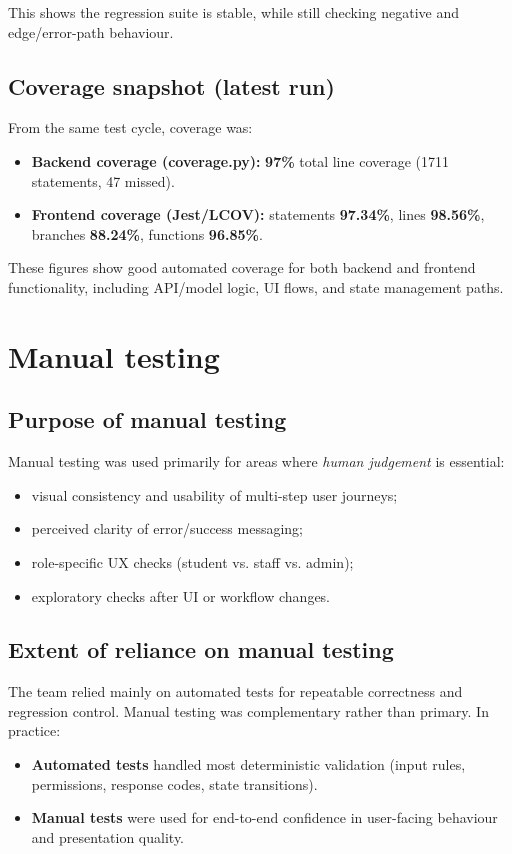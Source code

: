 This shows the regression suite is stable, while still checking negative and edge/error-path behaviour.

\subsection{Coverage snapshot (latest run)}

From the same test cycle, coverage was:
\begin{itemize}
	\item \textbf{Backend coverage (coverage.py):} \textbf{97\%} total line coverage (1711 statements, 47 missed).
	\item \textbf{Frontend coverage (Jest/LCOV):} statements \textbf{97.34\%}, lines \textbf{98.56\%}, branches \textbf{88.24\%}, functions \textbf{96.85\%}.
\end{itemize}

These figures show good automated coverage for both backend and frontend functionality, including API/model logic, UI flows, and state management paths.

\section{Manual testing}

\subsection{Purpose of manual testing}

Manual testing was used primarily for areas where \emph{human judgement} is essential:
\begin{itemize}
	\item visual consistency and usability of multi-step user journeys;
	\item perceived clarity of error/success messaging;
	\item role-specific UX checks (student vs. staff vs. admin);
	\item exploratory checks after UI or workflow changes.
\end{itemize}

\subsection{Extent of reliance on manual testing}

The team relied mainly on automated tests for repeatable correctness and regression control. Manual testing was complementary rather than primary. In practice:
\begin{itemize}
	\item \textbf{Automated tests} handled most deterministic validation (input rules, permissions, response codes, state transitions).
	\item \textbf{Manual tests} were used for end-to-end confidence in user-facing behaviour and presentation quality.
\end{itemize}

